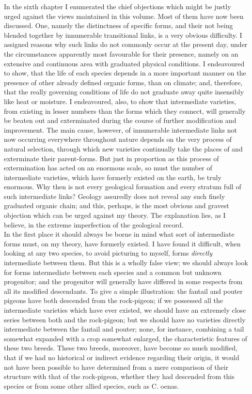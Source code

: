 \indent In the sixth chapter I enumerated the chief objections which might be justly urged against the views maintained in this volume.  Most of them have now been discussed. One, namely the distinctness of specific forms, and their not being blended together by innumerable transitional links, is a very obvious difficulty. I assigned reasons why such links do not commonly occur at the present day, under the circumstances apparently most favourable for their presence, namely on an extensive and continuous area with graduated physical conditions.  I endeavoured to show, that the life of each species depends in a more important manner on the presence of other already defined organic forms, than on climate; and, therefore, that the really governing conditions of life do not graduate away quite insensibly like heat or moisture.  I endeavoured, also, to show that intermediate varieties, from existing in lesser numbers than the forms which they connect, will generally be beaten out and exterminated during the course of further modification and improvement.  The main cause, however, of innumerable intermediate links not now occurring everywhere throughout nature depends on the very process of natural selection, through which new varieties continually take the places of and exterminate their parent-forms. But just in proportion as this process of extermination has acted on an enormous scale, so must the number of intermediate varieties, which have formerly existed on the earth, be truly enormous. Why then is not every geological formation and every stratum full of such intermediate links? Geology assuredly does not reveal any such finely graduated organic chain; and this, perhaps, is the most obvious and gravest objection which can be urged against my theory. The explanation lies, as I believe, in the extreme imperfection of the geological record.\\
\indent In the first place it should always be borne in mind what sort of intermediate forms must, on my theory, have formerly existed. I have found it difficult, when looking at any two species, to avoid picturing to myself, forms \emph{directly} intermediate between them. But this is a wholly false view; we should always look for forms intermediate between each species and a common but unknown progenitor; and the progenitor will generally have differed in some respects from all its modified descendants. To give a simple illustration: the fantail and pouter pigeons have both descended from the rock-pigeon; if we possessed all the intermediate varieties which have ever existed, we should have an extremely close series between both and the rock-pigeon; but we should have no varieties directly intermediate between the fantail and pouter; none, for instance, combining a tail somewhat expanded with a crop somewhat enlarged, the characteristic features of these two breeds. These two breeds, moreover, have become so much modified, that if we had no historical or indirect evidence regarding their origin, it would not have been possible to have determined from a mere comparison of their structure with that of the rock-pigeon, whether they had descended from this species or from some other allied species, such as C. oenas.\\
